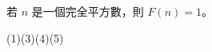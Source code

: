 \begin{QUESTIONS}
\begin{QUESTION}
\begin{QBODY}
\begin{QOPS}
				\QOP 若 $n$ 是一個完全平方數，則 $F(n) =1$。
			\end{QOPS}
        \end{QBODY}
        \begin{QFROMS}
        \end{QFROMS}
        \begin{QTAGS}\end{QTAGS}
        \begin{QANS}
            (1)(3)(4)(5)
        \end{QANS}
        \begin{QSOLLIST}
        \end{QSOLLIST}
        \begin{QEMPTYSPACE}
        \end{QEMPTYSPACE}
    \end{QUESTION}
\end{QUESTIONS}
